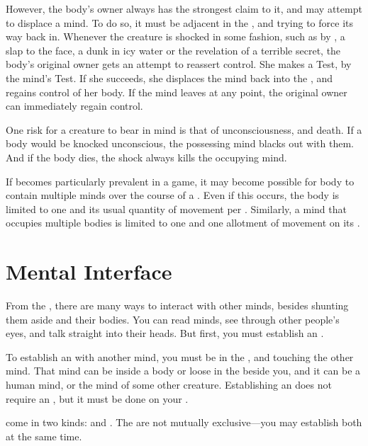 However, the body's owner always has the strongest claim to it, and may attempt to displace a {\possessing} mind.
To do so, it must be adjacent in the {\mentalrealm}, and trying to force its way back in.
Whenever the {\possessing} creature is shocked in some fashion, such as by {\damage}, a slap to the face, a dunk in icy water or the revelation of a terrible secret, the body's original owner gets an attempt to reassert control.
She makes a  Test, {\opposed} by the {\possessing} mind's  Test.
If she succeeds, she displaces the {\possessing} mind back into the {\mentalrealm}, and regains control of her body.
If the {\possessing} mind leaves at any point, the original owner can immediately regain control.

One risk for a {\possessing} creature to bear in mind is that of unconsciousness, and death.
If a body would be knocked unconscious, the possessing mind blacks out with them.
And if the body dies, the shock always kills the occupying mind.

If {\possession} becomes particularly prevalent in a game, it may become possible for body to contain multiple minds over the course of a {\round}.
Even if this occurs, the body is limited to one {\action} and its usual quantity of movement per {\round}.
Similarly, a mind that occupies multiple bodies is limited to one {\action} and one allotment of movement on its {\turn}.

\section{Mental Interface}

From the {\mentalrealm}, there are many ways to interact with other minds, besides shunting them aside and {\possessing} their bodies.
You can read minds, see through other people's eyes, and talk straight into their heads.
But first, you must establish an {\interface}.

To establish an {\interface} with another mind, you must be in the {\mentalrealm}, and touching the other mind.
That mind can be inside a body or loose in the {\mentalrealm} beside you, and it can be a human mind, or the mind of some other creature.
Establishing an {\interface} does not require an {\action}, but it must be done on your {\turn}.

{\interfaces} come in two kinds: {\overtinterfaces} and {\subtleinterfaces}.
The {\interfaces} are not mutually exclusive---you may establish both at the same time.

